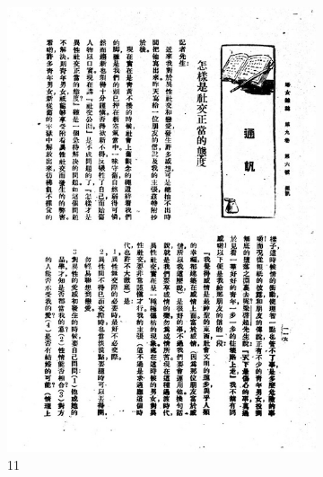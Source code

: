 \documentclass[12pt,twoside]{report}
\begin{document}
\begin{appendices}
\begin{figure}[htbp]
\begin{subfigure}[b]{0.23\linewidth}
        \includegraphics[width=\linewidth]{./figures/testset/11.jpg}
        \caption{11}
        \label{fig:test_11}
    \end{subfigure}
    \hfill
    \begin{subfigure}[b]{0.23\linewidth}

\end{subfigure}
\end{figure}
\end{appendices}
\end{document}
